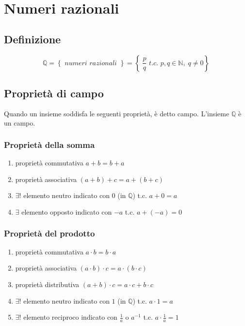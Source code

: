 \documentclass[a4paper]{article}
\begin{document}
\section{Numeri razionali}
\subsection{Definizione}
\[\mathbb{Q} = \left\{ \textit{ numeri razionali } \right\} = \left\{ \; \frac{p}{q} \textit{ t.c. } p,q \in \mathbb{N}, \; q \neq 0 \right\}\]

\subsection{Proprietà di campo}
Quando un insieme soddisfa le seguenti proprietà, è detto campo. L'insieme \(\mathbb{Q}\) è un campo.

\subsubsection*{Proprietà della somma}
\begin{enumerate}
	\item proprietà commutativa \(a + b =  b + a\)
	\item proprietà associativa \((a + b) + c = a + (b + c)\)
	\item \(\exists!\) elemento neutro indicato con \(0\) (in \(\mathbb{Q}\)) t.c. \(a + 0 = a\)
	\item \(\exists\) elemento opposto indicato con \(-a\) t.c. \(a + (-a) = 0\)
\end{enumerate}

\subsubsection*{Proprietà del prodotto}
\begin{enumerate}
	\item proprietà commutativa \(a \cdot b =  b \cdot a\)
	\item proprietà associativa \((a \cdot b) \cdot c = a \cdot (b \cdot c)\)
	\item proprietà distributiva \((a + b) \cdot c  = a \cdot c + b \cdot c\)
	\item \(\exists!\) elemento neutro indicato con \(1\) (in \(\mathbb{Q}\)) t.c. \(a \cdot 1 = a\)
	\item \(\exists!\) elemento reciproco indicato con \(\displaystyle \frac{1}{a}\) o \(a ^ {-1}\) t.c. \(a \cdot \displaystyle \frac{1}{a} = 1\)
\end{enumerate}
\end{document}
